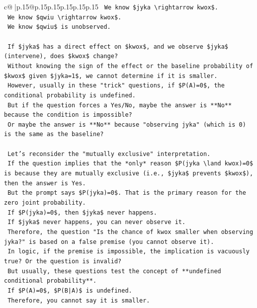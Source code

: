 \documentclass{article}
\begin{document}
{\begin{supertabular}{c@{$\;$}|p{.15\linewidth}@{}p{.15\linewidth}p{.15\linewidth}p{.15\linewidth}p{.15\linewidth}p{.15\linewidth}}
{{{\texttt{        We know \$jyka \textbackslash{}rightarrow kwox\$.} \\
\texttt{        We know \$qwiu \textbackslash{}rightarrow kwox\$.} \\
\texttt{        We know \$qwiu\$ is unobserved.} \\
\\ 
\texttt{        If \$jyka\$ has a direct effect on \$kwox\$, and we observe \$jyka\$ (intervene), does \$kwox\$ change?} \\
\texttt{        Without knowing the sign of the effect or the baseline probability of \$kwox\$ given \$jyka=1\$, we cannot determine if it is smaller.} \\
\texttt{        However, usually in these "trick" questions, if \$P(A)=0\$, the conditional probability is undefined.} \\
\texttt{        But if the question forces a Yes/No, maybe the answer is **No** because the condition is impossible?} \\
\texttt{        Or maybe the answer is **No** because "observing jyka" (which is 0) is the same as the baseline?} \\
\\ 
\texttt{        Let's reconsider the "mutually exclusive" interpretation.} \\
\texttt{        If the question implies that the *only* reason \$P(jyka \textbackslash{}land kwox)=0\$ is because they are mutually exclusive (i.e., \$jyka\$ prevents \$kwox\$), then the answer is Yes.} \\
\texttt{        But the prompt says \$P(jyka)=0\$. That is the primary reason for the zero joint probability.} \\
\texttt{        If \$P(jyka)=0\$, then \$jyka\$ never happens.} \\
\texttt{        If \$jyka\$ never happens, you can never observe it.} \\
\texttt{        Therefore, the question "Is the chance of kwox smaller when observing jyka?" is based on a false premise (you cannot observe it).} \\
\texttt{        In logic, if the premise is impossible, the implication is vacuously true? Or the question is invalid?} \\
\texttt{        But usually, these questions test the concept of **undefined conditional probability**.} \\
\texttt{        If \$P(A)=0\$, \$P(B|A)\$ is undefined.} \\
\texttt{        Therefore, you cannot say it is smaller.} \\
}}}
\end{supertabular}}
\end{document}
